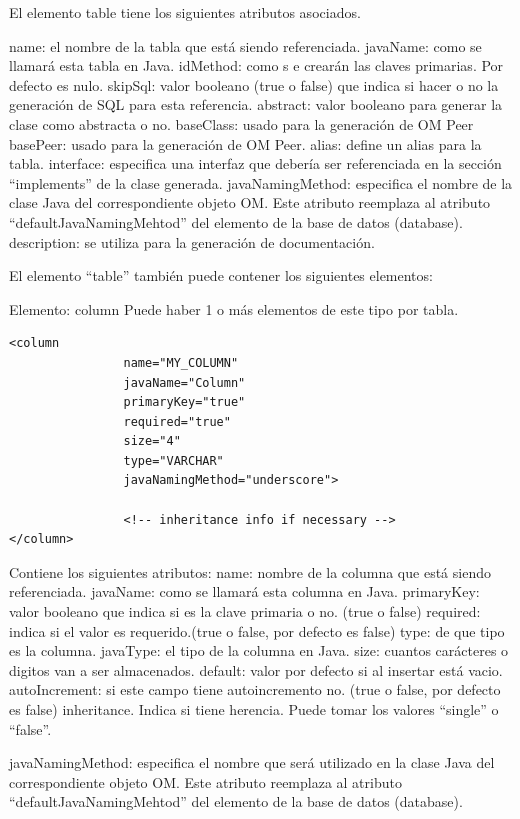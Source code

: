 \documentclass[12pt, oneside]{article}
\begin{document}
El elemento table tiene los siguientes atributos asociados.

name: el nombre de la tabla que está siendo referenciada.
javaName: como se llamará esta tabla en Java.
idMethod: como s e crearán las claves primarias. Por defecto es nulo.
skipSql: valor booleano (true o false) que indica si hacer o no la generación de SQL para esta referencia.
abstract: valor booleano para generar la clase como abstracta o no.
baseClass: usado para la generación de OM Peer
basePeer: usado para la generación de OM Peer.
alias: define un alias para la tabla.
interface: especifica una interfaz que debería ser referenciada en la sección “implements” de la clase generada.
javaNamingMethod: especifica el nombre de la clase Java del correspondiente objeto OM. Este atributo reemplaza al atributo “defaultJavaNamingMehtod” del elemento de la base de datos (database).
description: se utiliza para la generación de documentación.

El elemento “table” también puede contener los siguientes elementos:

Elemento: column
Puede haber 1 o más elementos de este tipo por tabla.

\begin{lstlisting}
<column
           		name="MY_COLUMN"
           		javaName="Column"
           		primaryKey="true"
           		required="true"
           		size="4"
           		type="VARCHAR"
           		javaNamingMethod="underscore">

           		<!-- inheritance info if necessary -->
</column>
\end{lstlisting}

Contiene los siguientes atributos:
name: nombre de la columna que está siendo referenciada.
javaName: como se llamará esta columna en Java.
primaryKey: valor booleano que indica si es la clave primaria o no. (true o false)
required: indica si el valor es requerido.(true o false, por defecto es false)
type: de que tipo es la columna.
javaType: el tipo de la columna en Java.
size: cuantos carácteres o digitos van a ser almacenados.
default: valor por defecto si al insertar está vacio.
autoIncrement: si este campo tiene autoincremento no. (true o false, por defecto es false)
inheritance. Indica si tiene herencia. Puede tomar los valores “single” o “false”.

javaNamingMethod: especifica el nombre que será utilizado en la clase Java del correspondiente objeto OM. Este atributo reemplaza al atributo “defaultJavaNamingMehtod” del elemento de la base de datos (database).
\end{document}
